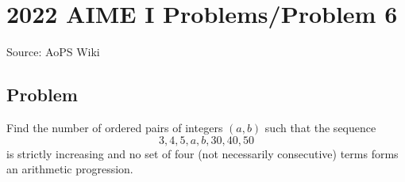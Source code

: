 \documentclass[12pt]{article}
\begin{document}
\section*{{2022 AIME I Problems/Problem 6}}
Source: AoPS Wiki

\subsection*{Problem}
Find the number of ordered pairs of integers $(a, b)$ such that the sequence \[3, 4, 5, a, b, 30, 40, 50\] is strictly increasing and no set of four (not necessarily consecutive) terms forms an arithmetic progression.
\end{document}
